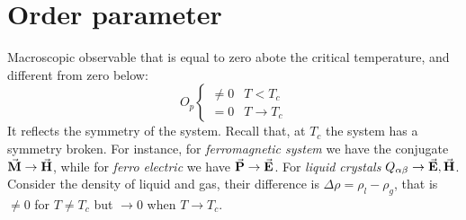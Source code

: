\documentclass[../main/main.tex]{subfiles}
\begin{document}
\section{Order parameter}
Macroscopic observable that is equal to zero abote the critical temperature, and different from zero below:
\begin{equation}
O_p
  \begin{cases}
  \neq 0 & T<T_c \\
  = 0 & T \rightarrow T_c
  \end{cases}
\label{eq:}
\end{equation}
It reflects the symmetry of the system. Recall that, at \( T_c \) the system has a symmetry broken.
For instance, for \emph{ferromagnetic system} we have the conjugate \( \va{M} \rightarrow \va{H}   \), while for \emph{ferro electric} we have \( \va{P} \rightarrow \va{E}   \). For \emph{liquid crystals} \( Q_{\alpha \beta } \rightarrow \va{E},\va{H}   \).
Consider the density of liquid and gas, their difference is \( \Delta \rho = \rho _{l} - \rho _{g} \), that is \( \neq 0 \) for \( T \neq T_c \) but \( \rightarrow 0 \) when \( T \rightarrow T_c \).
\end{document}
